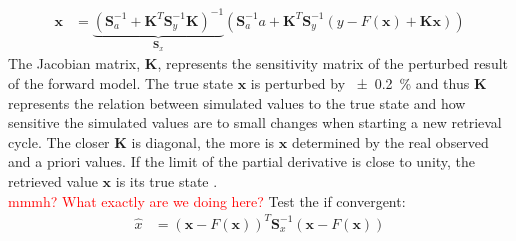 \begin{align}
	\mathbf{x} & = \underbrace{\left( \mathbf{S}_a^{-1} + \mathbf{K}^T \mathbf{S}_y^{-1} \mathbf{K} \right)^{-1} }_\text{$\mathbf{S}_x$} \left( \mathbf{S}_a^{-1} a + \mathbf{K}^T \mathbf{S}_y^{-1} \left(y - F(\mathbf{x}) + \mathbf{K} \mathbf{x} \right)  \right)
\end{align}
The Jacobian matrix, $\mathbf{K}$, represents the sensitivity matrix of the perturbed result of the forward model. The true state $\mathbf{x}$ is perturbed by \SI{\pm 0.2}{\percent} and thus $\mathbf{K}$ represents the relation between simulated values to the true state and how sensitive the simulated values are to small changes when starting a new retrieval cycle.   
The closer $\mathbf{K}$ is diagonal, the more is $\mathbf{x}$ determined by the real observed and a priori values. If the limit of the partial derivative is close to unity, the retrieved value $\mathbf{x}$ is its true state \citep{wood_estimation_2011}. 
\\[12pt]
\textcolor{red}{mmmh? What exactly are we doing here?}
Test the if convergent:
\begin{align}
	\hat{x} & = \left( \mathbf{x} - F(\mathbf{x}) \right)^T \mathbf{S}_x^{-1} \left(\mathbf{x} - F(\mathbf{x}) \right)
\end{align}
